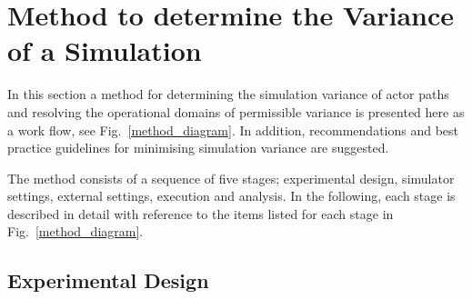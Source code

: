 \documentclass[letterpaper, 10 pt, journal, twoside]{IEEEtran}
\begin{document}
\section{Method to determine the Variance of a Simulation} \label{s:methodology}
%
In this section a method for determining the simulation variance of actor paths and resolving the operational domains of permissible variance is presented here as a work flow, see Fig.~\ref{method_diagram}.
%
In addition, recommendations and best practice guidelines for minimising simulation variance are suggested.
%

The method consists of a sequence of five stages; experimental design, simulator settings, external settings, execution and analysis. In the following, each stage is described in detail with reference to the items listed for each stage in Fig.~\ref{method_diagram}.

\subsection{Experimental Design}\label{s:design_experiment}

\end{document}
